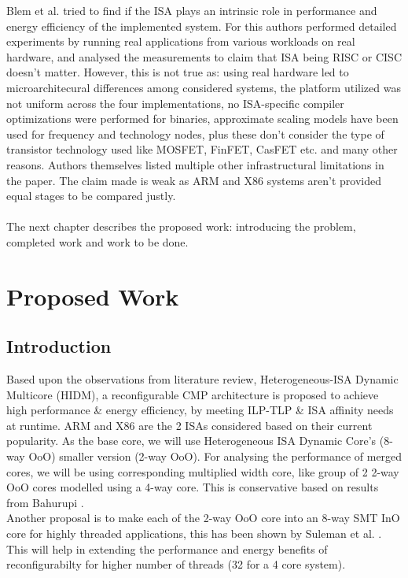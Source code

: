 \documentclass[a4paper,12pt, final]{report}
\begin{document}
\indent Blem et al. \cite{blempower} tried to find if the ISA plays an intrinsic role in performance and energy efficiency of the implemented system. For this authors performed detailed experiments by running real applications from various workloads on real hardware, and analysed the measurements to claim that ISA being RISC or CISC doesn't matter. However, this is not true as: using real hardware led to microarchitecural differences among considered systems, the platform utilized was not uniform across the four implementations, no ISA-specific compiler optimizations were performed for binaries, approximate scaling models have been used for frequency and technology nodes, plus these don't consider the type of transistor technology used like MOSFET, FinFET, CasFET etc. and many other reasons. Authors themselves listed multiple other infrastructural limitations in the paper. The claim made is weak as ARM and X86 systems aren't provided equal stages to be compared justly. \\\\ \indent The next chapter describes the proposed work: introducing the problem, completed work and work to be done.
\chapter{Proposed Work}
\section{Introduction}
Based upon the observations from literature review, Heterogeneous-ISA Dynamic Multicore (HIDM), a reconfigurable CMP architecture is proposed to achieve high performance \& energy efficiency, by meeting ILP-TLP \& ISA affinity needs at runtime. ARM and X86 are the 2 ISAs considered based on their current popularity. As the base core, we will use Heterogeneous ISA Dynamic Core's (8-way OoO) smaller version (2-way OoO). For analysing the performance of merged cores, we will be using corresponding multiplied width core, like group of 2 2-way OoO cores modelled using a 4-way core. This is conservative based on results from Bahurupi \cite{pricopi2012bahurupi}. \\
\indent Another proposal is to make each of the 2-way OoO core into an 8-way SMT InO core for highly threaded applications, this has been shown by Suleman et al. \cite{suleman2012morphcore}. This will help in extending the performance and energy benefits of reconfigurabilty for higher number of threads (32 for a 4 core system).  
\end{document}
